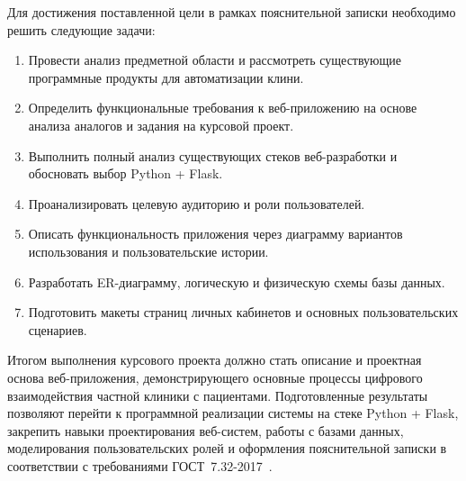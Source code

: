 Для достижения поставленной цели в рамках пояснительной записки необходимо решить следующие задачи:

\begin{enumerate}
\item Провести анализ предметной области и рассмотреть существующие программные продукты для автоматизации клини.
\item Определить функциональные требования к веб-приложению на основе анализа аналогов и задания на курсовой проект.
\item Выполнить полный анализ существующих стеков веб-разработки и обосновать выбор Python + Flask.
\item Проанализировать целевую аудиторию и роли пользователей.
\item Описать функциональность приложения через диаграмму вариантов использования и пользовательские истории.
\item Разработать ER-диаграмму, логическую и физическую схемы базы данных.
\item Подготовить макеты страниц личных кабинетов и основных пользовательских сценариев.
\end{enumerate}

Итогом выполнения курсового проекта должно стать описание и проектная основа веб-приложения, демонстрирующего основные процессы цифрового взаимодействия частной клиники с пациентами. Подготовленные результаты позволяют перейти к программной реализации системы на стеке Python + Flask, закрепить навыки проектирования веб-систем, работы с базами данных, моделирования пользовательских ролей и оформления пояснительной записки в соответствии с требованиями ГОСТ~7.32-2017~\cite{gost_report}.
